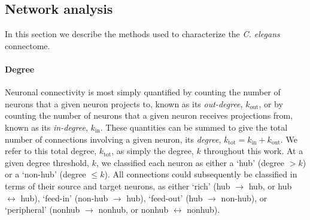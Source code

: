 \documentclass[10pt,letterpaper]{article}
\begin{document}
\subsection*{Network analysis}

In this section we describe the methods used to characterize the \emph{C. elegans} connectome.

\paragraph{Degree}
Neuronal connectivity is most simply quantified by counting the number of neurons that a given neuron projects to, known as its \emph{out-degree}, $k_\mathrm{out}$, or by counting the number of neurons that a given neuron receives projections from, known as its \emph{in-degree}, $k_\mathrm{in}$.
These quantities can be summed to give the total number of connections involving a given neuron, its \emph{degree}, $k_\mathrm{tot} = k_\mathrm{in} + k_\mathrm{out}$.
We refer to this total degree, $k_\mathrm{tot}$, as simply the degree, $k$ throughout this work.
At a given degree threshold, $k$, we classified each neuron as either a `hub' (degree $>k$) or a `non-hub' (degree $\leq k$).
All connections could subsequently be classified in terms of their source and target neurons, as either `rich' (hub $\rightarrow$ hub, or hub $\leftrightarrow$ hub), `feed-in' (non-hub $\rightarrow$ hub), `feed-out' (hub $\rightarrow$ non-hub), or `peripheral' (nonhub $\rightarrow$ nonhub, or nonhub $\leftrightarrow$ nonhub).
\end{document}
